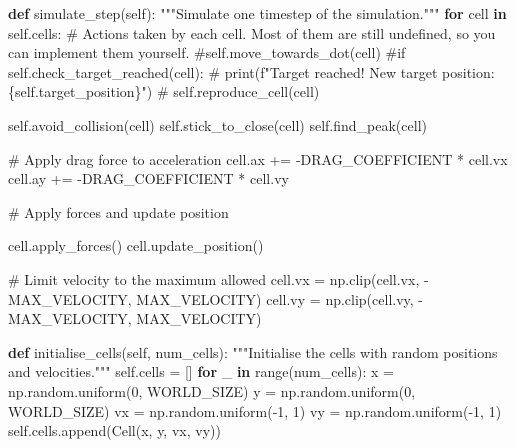 \documentclass[
  letterpaper,
  DIV=11,
  numbers=noendperiod]{scrreprt}
\newenvironment{Shaded}{\begin{snugshade}}{\end{snugshade}}
\newcommand{\BuiltInTok}[1]{\textcolor[rgb]{0.00,0.23,0.31}{#1}}
\newcommand{\CommentTok}[1]{\textcolor[rgb]{0.37,0.37,0.37}{#1}}
\newcommand{\ControlFlowTok}[1]{\textcolor[rgb]{0.00,0.23,0.31}{\textbf{#1}}}
\newcommand{\DecValTok}[1]{\textcolor[rgb]{0.68,0.00,0.00}{#1}}
\newcommand{\KeywordTok}[1]{\textcolor[rgb]{0.00,0.23,0.31}{\textbf{#1}}}
\newcommand{\NormalTok}[1]{\textcolor[rgb]{0.00,0.23,0.31}{#1}}
\newcommand{\OperatorTok}[1]{\textcolor[rgb]{0.37,0.37,0.37}{#1}}
\newcommand{\VariableTok}[1]{\textcolor[rgb]{0.07,0.07,0.07}{#1}}
\theoremstyle{definition}
\theoremstyle{remark}
\begin{document}
\begin{tcolorbox}
\begin{Shaded}
\begin{Highlighting}[]
    \KeywordTok{def}\NormalTok{ simulate\_step(}\VariableTok{self}\NormalTok{):}
        \CommentTok{"""Simulate one timestep of the simulation."""}
        \ControlFlowTok{for}\NormalTok{ cell }\KeywordTok{in} \VariableTok{self}\NormalTok{.cells:}
            \CommentTok{\# Actions taken by each cell. Most of them are still undefined, so you can implement them yourself.}
            \CommentTok{\#self.move\_towards\_dot(cell)  }
            \CommentTok{\#if self.check\_target\_reached(cell):}
            \CommentTok{\#    print(f"Target reached! New target position: \{self.target\_position\}")}
            \CommentTok{\#    self.reproduce\_cell(cell) }
            
            \VariableTok{self}\NormalTok{.avoid\_collision(cell)}
            \VariableTok{self}\NormalTok{.stick\_to\_close(cell)}
            \VariableTok{self}\NormalTok{.find\_peak(cell)}
            
            \CommentTok{\# Apply drag force to acceleration}
\NormalTok{            cell.ax }\OperatorTok{+=} \OperatorTok{{-}}\NormalTok{DRAG\_COEFFICIENT }\OperatorTok{*}\NormalTok{ cell.vx}
\NormalTok{            cell.ay }\OperatorTok{+=} \OperatorTok{{-}}\NormalTok{DRAG\_COEFFICIENT }\OperatorTok{*}\NormalTok{ cell.vy}

            \CommentTok{\# Apply forces and update position}
            
\NormalTok{            cell.apply\_forces()}
\NormalTok{            cell.update\_position()}

            \CommentTok{\# Limit velocity to the maximum allowed}
\NormalTok{            cell.vx }\OperatorTok{=}\NormalTok{ np.clip(cell.vx, }\OperatorTok{{-}}\NormalTok{MAX\_VELOCITY, MAX\_VELOCITY)}
\NormalTok{            cell.vy }\OperatorTok{=}\NormalTok{ np.clip(cell.vy, }\OperatorTok{{-}}\NormalTok{MAX\_VELOCITY, MAX\_VELOCITY)}

    \KeywordTok{def}\NormalTok{ initialise\_cells(}\VariableTok{self}\NormalTok{, num\_cells):}
        \CommentTok{"""Initialise the cells with random positions and velocities."""}
        \VariableTok{self}\NormalTok{.cells }\OperatorTok{=}\NormalTok{ []}
        \ControlFlowTok{for}\NormalTok{ \_ }\KeywordTok{in} \BuiltInTok{range}\NormalTok{(num\_cells):}
\NormalTok{            x }\OperatorTok{=}\NormalTok{ np.random.uniform(}\DecValTok{0}\NormalTok{, WORLD\_SIZE)}
\NormalTok{            y }\OperatorTok{=}\NormalTok{ np.random.uniform(}\DecValTok{0}\NormalTok{, WORLD\_SIZE)}
\NormalTok{            vx }\OperatorTok{=}\NormalTok{ np.random.uniform(}\OperatorTok{{-}}\DecValTok{1}\NormalTok{, }\DecValTok{1}\NormalTok{)}
\NormalTok{            vy }\OperatorTok{=}\NormalTok{ np.random.uniform(}\OperatorTok{{-}}\DecValTok{1}\NormalTok{, }\DecValTok{1}\NormalTok{)}
            \VariableTok{self}\NormalTok{.cells.append(Cell(x, y, vx, vy))}


\end{Highlighting}
\end{Shaded}
\end{tcolorbox}
\end{document}
